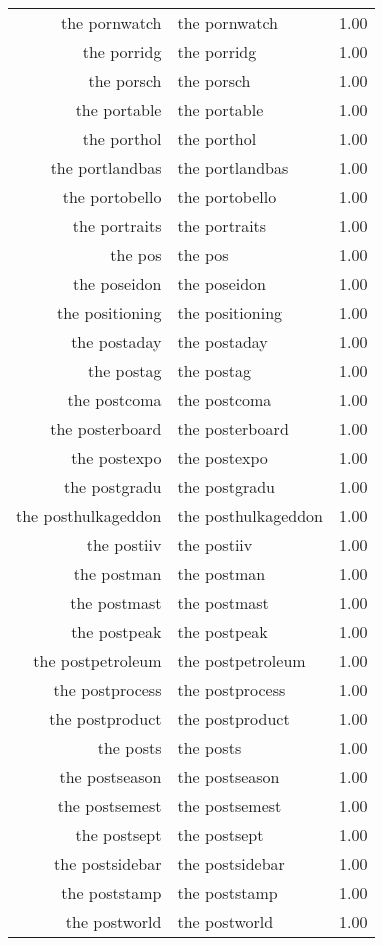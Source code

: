 \begin{table}[ht]
\begin{tabular}{rlr}
  the pornwatch & the pornwatch & 1.00 \\ 
  the porridg & the porridg & 1.00 \\ 
  the porsch & the porsch & 1.00 \\ 
  the portable & the portable & 1.00 \\ 
  the porthol & the porthol & 1.00 \\ 
  the portlandbas & the portlandbas & 1.00 \\ 
  the portobello & the portobello & 1.00 \\ 
  the portraits & the portraits & 1.00 \\ 
  the pos & the pos & 1.00 \\ 
  the poseidon & the poseidon & 1.00 \\ 
  the positioning & the positioning & 1.00 \\ 
  the postaday & the postaday & 1.00 \\ 
  the postag & the postag & 1.00 \\ 
  the postcoma & the postcoma & 1.00 \\ 
  the posterboard & the posterboard & 1.00 \\ 
  the postexpo & the postexpo & 1.00 \\ 
  the postgradu & the postgradu & 1.00 \\ 
  the posthulkageddon & the posthulkageddon & 1.00 \\ 
  the postiiv & the postiiv & 1.00 \\ 
  the postman & the postman & 1.00 \\ 
  the postmast & the postmast & 1.00 \\ 
  the postpeak & the postpeak & 1.00 \\ 
  the postpetroleum & the postpetroleum & 1.00 \\ 
  the postprocess & the postprocess & 1.00 \\ 
  the postproduct & the postproduct & 1.00 \\ 
  the posts & the posts & 1.00 \\ 
  the postseason & the postseason & 1.00 \\ 
  the postsemest & the postsemest & 1.00 \\ 
  the postsept & the postsept & 1.00 \\ 
  the postsidebar & the postsidebar & 1.00 \\ 
  the poststamp & the poststamp & 1.00 \\ 
  the postworld & the postworld & 1.00 \\ 

\end{tabular}
\end{table}
